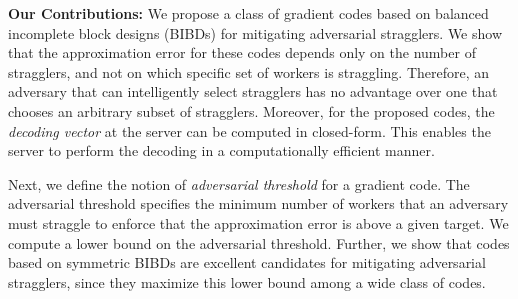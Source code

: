 \documentclass[conference,letterpaper]{IEEEtran}
\begin{document}
{\bf Our Contributions:} We propose a class of gradient codes based on balanced incomplete block designs (BIBDs) for mitigating adversarial stragglers. We show that the approximation error for these codes depends only on the number of stragglers, and not on which specific set of workers is straggling. Therefore, an adversary that can intelligently select stragglers has no advantage over one that chooses an arbitrary subset of stragglers. Moreover, for the proposed codes, the {\it decoding vector} at the server can be computed in closed-form. This enables the server to perform the decoding in a computationally efficient manner.

Next, we define the notion of {\it adversarial threshold} for a gradient code. The adversarial threshold specifies the minimum number of workers that an adversary must straggle to enforce that the approximation error is above a given target. %
{We compute a lower bound on the adversarial threshold. Further, we show that codes based on symmetric BIBDs are excellent candidates for mitigating adversarial stragglers, since they maximize this lower bound among a wide class of codes.}


\end{document}
